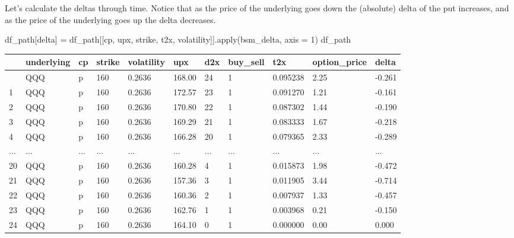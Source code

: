 \documentclass[
  letterpaper,
  DIV=11,
  numbers=noendperiod]{scrreprt}
\newenvironment{Shaded}{\begin{snugshade}}{\end{snugshade}}
\newcommand{\BuiltInTok}[1]{\textcolor[rgb]{0.00,0.23,0.31}{#1}}
\newcommand{\DecValTok}[1]{\textcolor[rgb]{0.68,0.00,0.00}{#1}}
\newcommand{\NormalTok}[1]{\textcolor[rgb]{0.00,0.23,0.31}{#1}}
\newcommand{\OperatorTok}[1]{\textcolor[rgb]{0.37,0.37,0.37}{#1}}
\newcommand{\StringTok}[1]{\textcolor[rgb]{0.13,0.47,0.30}{#1}}
\begin{document}
Let's calculate the deltas through time. Notice that as the price of the
underlying goes down the (absolute) delta of the put increases, and as
the price of the underlying goes up the delta decreases.

\begin{Shaded}
\begin{Highlighting}[]
\NormalTok{df\_path[}\StringTok{\textquotesingle{}delta\textquotesingle{}}\NormalTok{] }\OperatorTok{=}\NormalTok{ df\_path[[}\StringTok{\textquotesingle{}cp\textquotesingle{}}\NormalTok{, }\StringTok{\textquotesingle{}upx\textquotesingle{}}\NormalTok{, }\StringTok{\textquotesingle{}strike\textquotesingle{}}\NormalTok{, }\StringTok{\textquotesingle{}t2x\textquotesingle{}}\NormalTok{, }\StringTok{\textquotesingle{}volatility\textquotesingle{}}\NormalTok{]].}\BuiltInTok{apply}\NormalTok{(bsm\_delta, axis }\OperatorTok{=} \DecValTok{1}\NormalTok{)}
\NormalTok{df\_path}
\end{Highlighting}
\end{Shaded}

\begin{longtable}[]{@{}lllllllllll@{}}
\toprule\noalign{}
& underlying & cp & strike & volatility & upx & d2x & buy\_sell & t2x &
option\_price & delta \\
\midrule\noalign{}
\endhead
\bottomrule\noalign{}
\endlastfoot
0 & QQQ & p & 160 & 0.2636 & 168.00 & 24 & 1 & 0.095238 & 2.25 &
-0.261 \\
1 & QQQ & p & 160 & 0.2636 & 172.57 & 23 & 1 & 0.091270 & 1.21 &
-0.161 \\
2 & QQQ & p & 160 & 0.2636 & 170.80 & 22 & 1 & 0.087302 & 1.44 &
-0.190 \\
3 & QQQ & p & 160 & 0.2636 & 169.29 & 21 & 1 & 0.083333 & 1.67 &
-0.218 \\
4 & QQQ & p & 160 & 0.2636 & 166.28 & 20 & 1 & 0.079365 & 2.33 &
-0.289 \\
... & ... & ... & ... & ... & ... & ... & ... & ... & ... & ... \\
20 & QQQ & p & 160 & 0.2636 & 160.28 & 4 & 1 & 0.015873 & 1.98 &
-0.472 \\
21 & QQQ & p & 160 & 0.2636 & 157.36 & 3 & 1 & 0.011905 & 3.44 &
-0.714 \\
22 & QQQ & p & 160 & 0.2636 & 160.36 & 2 & 1 & 0.007937 & 1.33 &
-0.457 \\
23 & QQQ & p & 160 & 0.2636 & 162.76 & 1 & 1 & 0.003968 & 0.21 &
-0.150 \\
24 & QQQ & p & 160 & 0.2636 & 164.10 & 0 & 1 & 0.000000 & 0.00 &
0.000 \\
\end{longtable}
\end{document}
